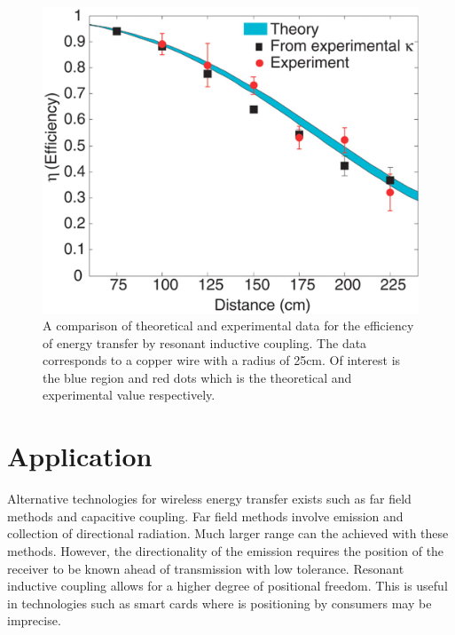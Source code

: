 \documentclass[a4paper,justified,nobib]{tufte-handout}
\begin{document}
\begin{figure}
  \includegraphics[scale=0.22]{images/Experimental.jpg}
  \caption{A comparison of theoretical and experimental data for the efficiency
  of energy transfer by resonant inductive coupling.
  The data corresponds to a copper wire with a radius of 25cm.
  Of interest is the blue region and red dots which is the theoretical
  and experimental value respectively.\cite{StrongCouple}}
  \label{fig:efficiency}
\end{figure}

\section{Application}

Alternative technologies for wireless energy transfer exists such as far field methods
and capacitive coupling.
Far field methods involve emission and collection of directional radiation.
Much larger range can the achieved with these methods.
However, the directionality of the emission requires the position of the receiver to
be known ahead of transmission with low tolerance.
Resonant inductive coupling allows for a higher degree of positional freedom.
This is useful in technologies such as smart cards where is positioning by consumers
may be imprecise.
\end{document}
